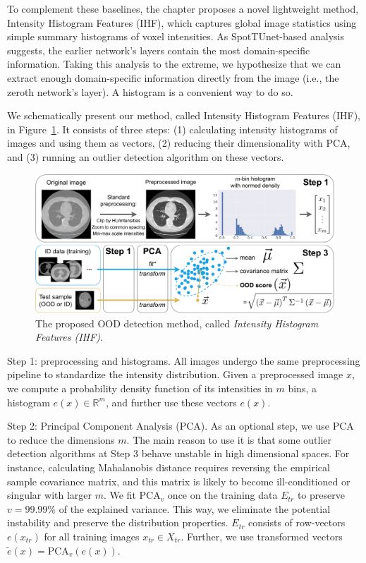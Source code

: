 To complement these baselines, the chapter proposes a novel lightweight method, Intensity Histogram Features (IHF), which captures global image statistics using simple summary histograms of voxel intensities. As SpotTUnet-based analysis suggests, the earlier network's layers contain the most domain-specific information. Taking this analysis to the extreme, we hypothesize that we can extract enough domain-specific information directly from the image (i.e., the zeroth network's layer). A histogram is a convenient way to do so.

We schematically present our method, called Intensity Histogram Features (IHF), in Figure~\ref{fig:ihf}. It consists of three steps: (1) calculating intensity histograms of images and using them as vectors, (2) reducing their dimensionality with PCA, and (3) running an outlier detection algorithm on these vectors.

\begin{landscape}
	\begin{figure}[p]
		\centering
		\includegraphics[width=\linewidth]{Dissertation/Figures/5_ood_bench/method-1.pdf}
		\caption{The proposed OOD detection method, called \textit{Intensity Histogram Features (IHF)}.}
		\label{fig:ihf}
	\end{figure}
\end{landscape}

Step 1: preprocessing and histograms. All images undergo the same preprocessing pipeline to standardize the intensity distribution. Given a preprocessed image $x$, we compute a probability density function of its intensities in $m$ bins, a histogram $e(x) \in \mathbb{R}^m$, and further use these vectors $e(x)$.
	
Step 2: Principal Component Analysis (PCA). As an optional step, we use PCA~\cite{pca} to reduce the dimensions $m$. The main reason to use it is that some outlier detection algorithms at Step 3 behave unstable in high dimensional spaces. For instance, calculating Mahalanobis distance requires reversing the empirical sample covariance matrix, and this matrix is likely to become ill-conditioned or singular with larger $m$. We fit PCA$_v$ once on the training data $E_{tr}$ to preserve $v = 99.99\%$ of the explained variance. This way, we eliminate the potential instability and preserve the distribution properties. $E_{tr}$ consists of row-vectors $e(x_{tr})$ for all training images $x_{tr} \in X_{tr}$. Further, we use transformed vectors $\tilde{e}(x) = \text{PCA}_v (e(x))$.
	

